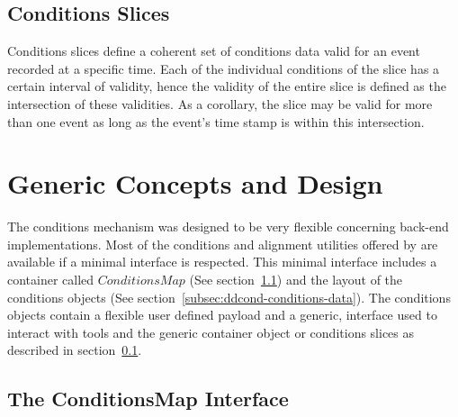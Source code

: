 \documentclass[10pt,a4paper]{article}
\begin{document}
\subsection{Conditions Slices}
\label{subsec:ddcond-conditions-slices}

\noindent
Conditions slices define a coherent set of conditions data valid for an event 
recorded at a specific time. Each of the individual conditions of the slice
has a certain interval of validity, hence the validity of the entire slice
is defined as the intersection of these validities.
As a corollary, the slice may be valid for more than one event as long as the
event's time stamp is within this intersection.

\newpage
\section{Generic Concepts and Design}
\label{sec:ddcond-design-concepts}

\noindent 
The \DDH conditions mechanism was designed to be very flexible concerning 
back-end implementations. Most of the conditions and alignment utilities offered 
by \DDH are available if a minimal interface is respected. This minimal interface
includes a container called $ConditionsMap$ (See section~\ref{subsec:ddcond-conditionsmap})
and the layout of the conditions objects (See section~\ref{subsec:ddcond-conditions-data}).
The conditions objects contain a flexible user defined payload and a generic, 
interface used to interact with tools and the generic container object or
conditions slices as described in section~\ref{subsec:ddcond-conditions-slices}.

\subsection{The ConditionsMap Interface}
\label{subsec:ddcond-conditionsmap}
\end{document}
